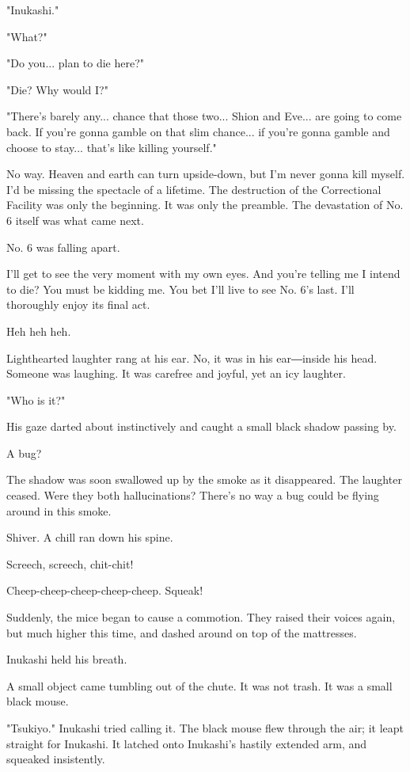 "Inukashi."

"What?"

"Do you... plan to die here?"

"Die? Why would I?"

"There's barely any... chance that those two... Shion and Eve... are
going to come back. If you're gonna gamble on that slim chance... if
you're gonna gamble and choose to stay... that's like killing yourself."

No way. Heaven and earth can turn upside-down, but I'm never gonna kill
myself. I'd be missing the spectacle of a lifetime. The destruction of
the Correctional Facility was only the beginning. It was only the
preamble. The devastation of No. 6 itself was what came next.

No. 6 was falling apart.

I'll get to see the very moment with my own eyes. And you're telling me
I intend to die? You must be kidding me. You bet I'll live to see No.
6's last. I'll thoroughly enjoy its final act.

Heh heh heh.

Lighthearted laughter rang at his ear. No, it was in his ear―inside his
head. Someone was laughing. It was carefree and joyful, yet an icy
laughter.

"Who is it?"

His gaze darted about instinctively and caught a small black shadow
passing by.

A bug?

The shadow was soon swallowed up by the smoke as it disappeared. The
laughter ceased. Were they both hallucinations? There's no way a bug
could be flying around in this smoke.

Shiver. A chill ran down his spine.

Screech, screech, chit-chit!

Cheep-cheep-cheep-cheep-cheep. Squeak!

Suddenly, the mice began to cause a commotion. They raised their voices
again, but much higher this time, and dashed around on top of the
mattresses.

Inukashi held his breath.

A small object came tumbling out of the chute. It was not trash. It was
a small black mouse.

"Tsukiyo." Inukashi tried calling it. The black mouse flew through the
air; it leapt straight for Inukashi. It latched onto Inukashi's hastily
extended arm, and squeaked insistently.

